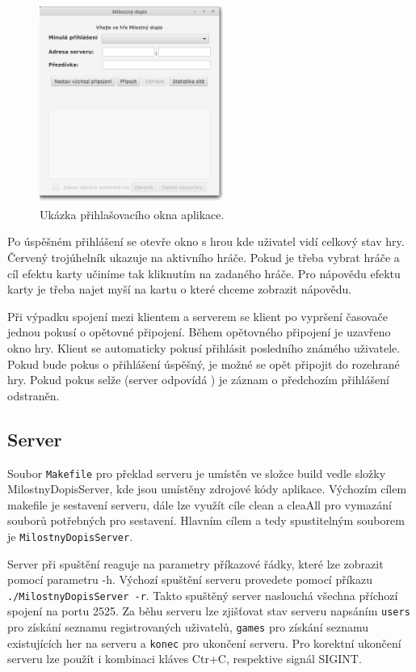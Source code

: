 \documentclass[12pt, a4paper]{article}
\begin{document}
\begin{figure}[ht]
\centering
\includegraphics[bb= 0 0 510 550 , width=6cm]{gui.png}
\caption{Ukázka přihlašovacího okna aplikace.}
\label{fig:game}
\end{figure}

Po úspěšném přihlášení se otevře okno s hrou kde uživatel vidí celkový stav hry. Červený trojúhelník ukazuje na aktivního hráče. Pokud je třeba vybrat hráče a cíl efektu karty učiníme tak kliknutím na zadaného hráče. Pro nápovědu efektu karty je třeba najet myší na kartu o které chceme zobrazit nápovědu.

Při výpadku spojení mezi klientem a serverem se klient po vypršení časovače jednou pokusí o opětovné připojení. Během opětovného připojení je uzavřeno okno hry. Klient se automaticky pokusí přihlásit posledního známého uživatele. Pokud bude pokus o přihlášení úspěšný, je možné se opět připojit do rozehrané hry. Pokud pokus selže (server odpovídá ) je záznam o předchozím přihlášení odstraněn.

\subsection{Server}

Soubor \texttt{Makefile} pro překlad serveru je umístěn ve složce build vedle složky MilostnyDopisServer, kde jsou umístěny zdrojové kódy aplikace. Výchozím cílem makefile je sestavení serveru, dále lze využít cíle clean a cleaAll pro vymazání souborů potřebných pro sestavení. Hlavním cílem a tedy spustitelným souborem je \texttt{MilostnyDopisServer}.

Server při spuštění reaguje na parametry příkazové řádky, které lze zobrazit pomocí parametru -h. Výchozí spuštění serveru provedete pomocí příkazu \texttt{./MilostnyDopisServer -r}. Takto spuštěný server naslouchá všechna příchozí spojení na portu 2525. Za běhu serveru lze zjišťovat stav serveru napsáním \texttt{users} pro získání seznamu registrovaných uživatelů, \texttt{games} pro získání seznamu existujících her na serveru a \texttt{konec} pro ukončení serveru. Pro korektní ukončení serveru lze použít i kombinaci kláves Ctr+C, respektive signál SIGINT. 
\end{document}
